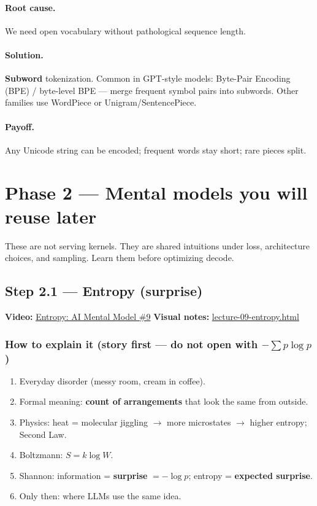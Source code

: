 \documentclass[11pt,a4paper]{article}
\begin{document}
\paragraph{Root cause.}

We need open vocabulary without pathological sequence length.


\paragraph{Solution.}

\textbf{Subword} tokenization. Common in GPT-style models: Byte-Pair Encoding (BPE) / byte-level BPE --- merge frequent symbol pairs into subwords. Other families use WordPiece or Unigram/SentencePiece.


\paragraph{Payoff.}

Any Unicode string can be encoded; frequent words stay short; rare pieces split.


\bigskip


\clearpage
\section{Phase 2 --- Mental models you will reuse later}


These are not serving kernels. They are shared intuitions under loss, architecture choices, and sampling. Learn them before optimizing decode.


\subsection{Step 2.1 --- Entropy (surprise)}


\textbf{Video:} \href{https://www.youtube.com/watch?v=q3agYqgqklU}{Entropy: AI Mental Model \#9}   \textbf{Visual notes:} \href{https://vizuaraai.github.io/great-mental-models-of-ai/lecture-09-entropy.html}{lecture-09-entropy.html}


\subsubsection{How to explain it (story first --- do not open with \(-\sum p\log p\))}


\begin{enumerate}
\item Everyday disorder (messy room, cream in coffee).  
\item Formal meaning: \textbf{count of arrangements} that look the same from outside.  
\item Physics: heat = molecular jiggling $\rightarrow$ more microstates $\rightarrow$ higher entropy; Second Law.  
\item Boltzmann: \(S = k \log W\).  
\item Shannon: information = \textbf{surprise} \(=-\log p\); entropy = \textbf{expected surprise}.  
\item Only then: where LLMs use the same idea.
\end{enumerate}
\end{document}
